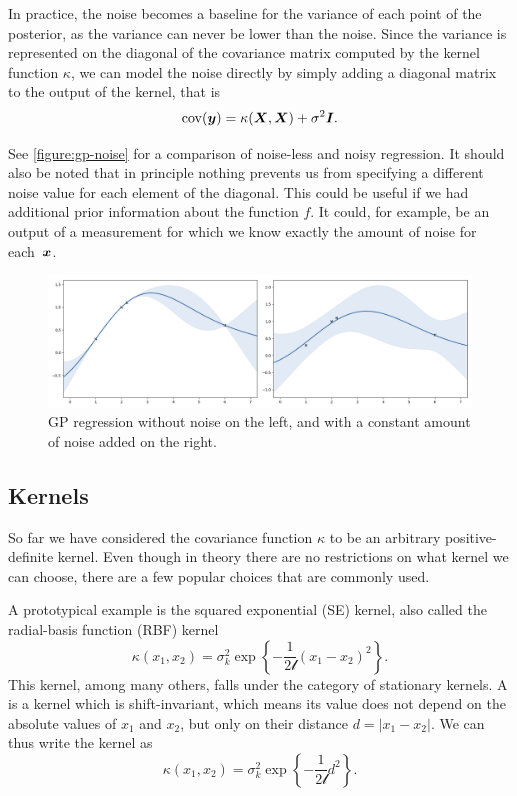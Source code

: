 In practice, the noise becomes a baseline for the variance of each point of the posterior,
as the variance can never be lower than the noise. Since the variance is represented on the
diagonal of the covariance matrix computed by the kernel function $\kappa$, we can model the noise
directly by simply adding a diagonal matrix to the output of the kernel, that is
$$
  \operatorname{cov}({\boldsymbol{y}}) = \kappa({\bm{X}}, {\bm{X}}) + \sigma^2{\bm{I}}.
$$

See \autoref{figure:gp-noise} for a comparison of noise-less and noisy
regression. It should also be noted that in principle nothing prevents us
from specifying a different noise value for each element of the diagonal. This
could be useful if we had additional prior information about the function $f$.
It could, for example, be an output of a measurement for which we know exactly
the amount of noise for each~${\boldsymbol{x}}$.

\begin{figure}
  \begin{center}
    \includegraphics[width=1.0\textwidth]{images/gp-noise.png}
    \caption{GP regression without noise on the left, and with a constant
    amount of noise added on the right.}
	\label{figure:gp-noise}
  \end{center}
\end{figure}


\subsection{Kernels}
\label{section:kernels}

So far we have considered the covariance function $\kappa$ to be an arbitrary
positive-definite kernel. Even though in theory there are no restrictions on
what kernel we can choose, there are a few popular choices that are
commonly used.

A prototypical example is the squared exponential (SE) kernel, also called the
radial-basis function (RBF) kernel
$$
\kappa(x_1, x_2) = \sigma_k^2\exp\left\{ -\frac{1}{2\mathcal{l}} (x_1 - x_2)^2 \right\}.
$$
This kernel, among many others, falls under the category of stationary kernels.
A  is a kernel which is shift-invariant, which means its
value does not depend on the absolute values of $x_1$ and $x_2$, but only on
their distance $d = |x_1 - x_2|$. We can thus write the kernel as
$$
\kappa(x_1, x_2) = \sigma_k^2\exp\left\{ -\frac{1}{2\mathcal{l}} d^2 \right\}.
$$

